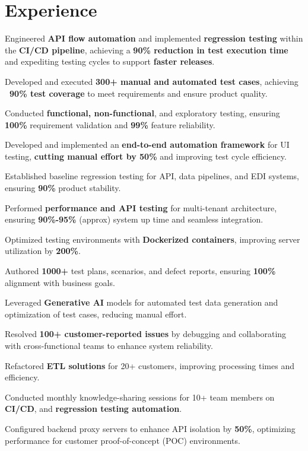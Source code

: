 \documentclass[]{deedy-resume-openfont}
\begin{document}
\begin{minipage}[t]{0.66\textwidth} 


\section{Experience}
\vspace{\topsep} %
\begin{tightemize}
\item Engineered \textbf{API flow automation} and implemented \textbf{regression testing} within the \textbf{CI/CD pipeline}, achieving a \textbf{90\% reduction in test execution time} and expediting testing cycles to support \textbf{faster releases}.
\item Developed and executed \textbf{300+ manual and automated test cases}, achieving \textbf{~90\% test coverage} to meet requirements and ensure product quality.
  \item Conducted \textbf{functional, non-functional}, and exploratory testing, ensuring \textbf{100\%} requirement validation and \textbf{99\%} feature reliability.
\item Developed and implemented an \textbf{end-to-end automation framework} for UI testing, \textbf{cutting manual effort by 50\%} and improving test cycle efficiency.
     \item Established baseline regression testing for API, data pipelines, and EDI systems, ensuring \textbf{90\% } product stability.
     \item Performed \textbf{performance and API testing} for multi-tenant architecture, ensuring \textbf{90\%-95\%} (approx) system up time and seamless integration.
    \item Optimized testing environments with \textbf{Dockerized containers}, improving server utilization by \textbf{200\%}.
    \item Authored \textbf{1000+} test plans, scenarios, and defect reports, ensuring \textbf{100\%} alignment with business goals.
\item Leveraged \textbf{Generative AI} models for automated test data generation and optimization of test cases, reducing manual effort.
    \item Resolved \textbf{100+ customer-reported issues} by debugging and collaborating with cross-functional teams to enhance system reliability.
    \item Refactored \textbf{ETL solutions} for 20+ customers, improving processing times and efficiency.
\item Conducted monthly knowledge-sharing sessions for 10+ team members on \textbf{CI/CD}, and \textbf{regression testing automation}.
  \item Configured backend proxy servers to enhance API isolation by \textbf{50\%}, optimizing performance for customer proof-of-concept (POC) environments.
\end{tightemize}
\sectionsep


\end{minipage}
\end{document}
